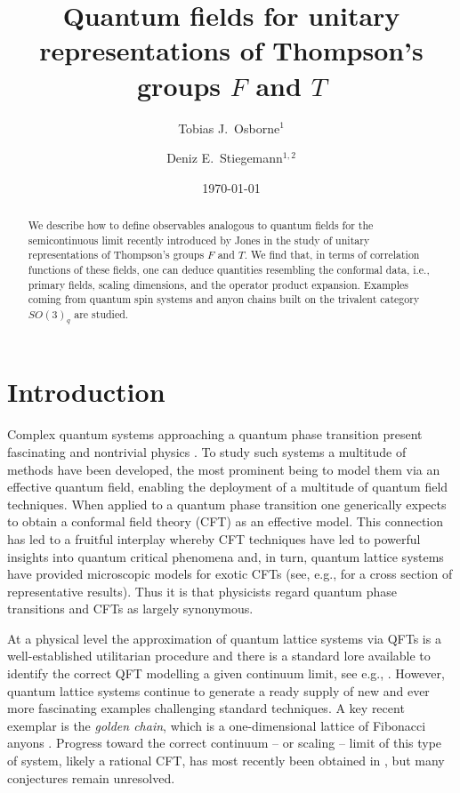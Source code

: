 \documentclass[11pt,oneside]{amsart}
\title[Quantum fields for Thompson's groups]{Quantum fields for unitary representations of Thompson's groups $F$ and $T$}
\author{Tobias J.\ Osborne$^1$}
\author{Deniz E.\ Stiegemann$^{1,2}$}
\date{\today}
\theoremstyle{plain}%
\theoremstyle{definition}
\theoremstyle{remark}
\begin{document}
\begin{abstract}
We describe how to define observables analogous to quantum fields for the semicontinuous limit recently introduced by Jones in the study of unitary representations of Thompson's groups $F$ and $T$. We find that, in terms of correlation functions of these fields, one can deduce quantities resembling the conformal data, i.e., primary fields, scaling dimensions, and the operator product expansion. Examples coming from quantum spin systems and anyon chains built on the trivalent category $\mathit{SO}(3)_q$ are studied.
\end{abstract}

\maketitle

\section{Introduction}
Complex quantum systems approaching a quantum phase transition present fascinating and nontrivial physics \cite{sachdevQuantumPhaseTransitions2011}. To study such systems a multitude of methods have been developed, the most prominent being to model them via an effective quantum field, enabling the deployment of a multitude of quantum field techniques. When applied to a quantum phase transition one generically expects to obtain a conformal field theory (CFT) \cites{francesco_conformal_1997,cardyConformalInvarianceUniversality1984,cardyOperatorContentTwodimensional1986,bloteConformalInvarianceCentral1986,cardyLogarithmicCorrectionsFinitesize1986,affleckUniversalTermFree1986} as an effective model. This connection has led to a fruitful interplay whereby CFT techniques have led to powerful insights into quantum critical phenomena and, in turn, quantum lattice systems have provided microscopic models for exotic CFTs (see, e.g., \cites{zouConformalFieldsOperator2019,kooRepresentationsVirasoroAlgebra1994a,readAssociativealgebraicApproachLogarithmic2007,dubailConformalFieldTheory2010,gainutdinovLogarithmicConformalField2013,gainutdinovLatticeFusionRules2013,bondesanChiralSUKcurrents2015,milstedExtractionConformalData2017,zouConformalDataRenormalization2018} for a cross section of representative results). Thus it is that physicists regard quantum phase transitions and CFTs as largely synonymous.

At a physical level the approximation of quantum lattice systems via QFTs is a well-established utilitarian procedure and there is a standard lore available to identify the correct QFT modelling a given continuum limit, see e.g., \cites{tsvelikQuantumFieldTheory2007,auerbachInteractingElectronsQuantum1994}. However, quantum lattice systems continue to generate a ready supply of new and ever more fascinating examples challenging standard techniques. A key recent exemplar is the \emph{golden chain}, which is a one-dimensional lattice of Fibonacci anyons \cite{feiguin_interacting_2007}. Progress toward the correct continuum -- or scaling -- limit of this type of system, likely a rational CFT, has most recently been obtained in \cite{ziniConformalFieldTheories2018}, but many conjectures remain unresolved.
\end{document}
